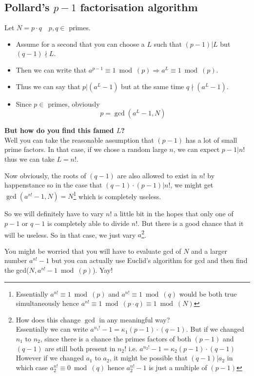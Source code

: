 		\subsection{Pollard's \(p-1\) factorisation algorithm}
			Let $N=p\cdot q \quad p,q\in$ primes. 
			\begin{itemize}
				\item Assume for a second that you can choose a $L$ such that \((p-1) | L\) but \((q-1) \nmid L\).
				\item Then we can write that \(a^{p-1}\equiv 1 \bmod(p) \Rightarrow a^L\equiv 1 \bmod(p)\).
				\item Thus we can say that \(p | (a^L-1)\) but at the same time \(q \nmid (a^L-1)\).
				\item Since \(p\in\) primes, obviously \[p=\gcd(a^L-1, N)\]
			\end{itemize}

			\textbf{But how do you find this famed \(L\)?}\\
			Well you can take the reasonable assumption that $(p-1)$ has a lot of small prime factors. In that case, if we chose a random large \(n\), we can expect \(p-1 | n!\) thus we can take \(L= n!\). 

			Now obviously, the roots of $(q-1)$ are also allowed to exist in $n!$ by happenstance so in the case that $(q-1)\cdot (p-1) | n!$, we might get \(\gcd(a^{n!}-1, N)=N\)\footnote{Essentially $a^{n!}\equiv1\bmod(p)$ and $a^{n!}\equiv1\bmod(q)$ would be both true simultaneously hence $a^{n!}\equiv1\bmod(p\cdot q)\equiv 1 \bmod(N)$} which is completely useless. \par So we will definitely have to vary $n!$ a little bit in the hopes that only one of $p-1$ or $q-1$ is completely able to divide $n!$. But there is a good chance that it will be useless. So in that case, we just vary $a$\footnote{How does this change $\gcd$ in any meaningful way?\\Essentially we can write \(a^{n_1!}-1 = \kappa_1 (p-1)\cdot (q-1)\). But if we changed $n_1$ to $n_2$, since there is a chance the primes factors of both $(p-1)$ and $(q-1)$ are still both present in $n_2!$ i.e. \(a^{n_2!}-1 = \kappa_2 (p-1)\cdot (q-1)\)\\However if we changed \(a_1\) to \(a_2\), it might be possible that $(q-1) | a_2$ in which case $a_2^{n!}\equiv 0\bmod(q)$ hence $a_2^{n!}-1$ is just a multiple of $(p-1)$}.\par

			\begin{tcolorbox}
				You might be worried that you will have to evaluate gcd of $N$ and a larger number \(a^{n!}-1\) but you can actually use Euclid's algorithm for gcd and then find the gcd(\(N, a^{n!}-1 \bmod(p)\)). Yay!
			\end{tcolorbox}


